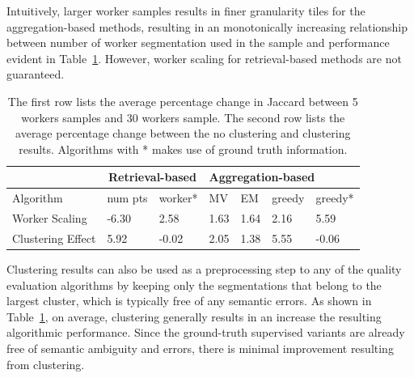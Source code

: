 \par \noindent Intuitively, larger worker samples results in finer granularity tiles for the aggregation-based methods, resulting in an monotonically increasing relationship between number of worker segmentation used in the sample and performance evident in Table~\ref{statsTable}. However, worker scaling for retrieval-based methods are not guaranteed.
\begin{table}[h!]
   \small
     \setlength\tabcolsep{1.5pt}
      \begin{tabular}{l|l|l|l|l|l|l}
         & \multicolumn{2}{c|}{Retrieval-based} & \multicolumn{4}{l}{Aggregation-based} \\ \hline
      Algorithm         & num pts         & worker*        & MV    & EM    & greedy  & greedy*  \\ \hline
      Worker Scaling    & -6.30           & 2.58               & 1.63  & 1.64  & 2.16    & 5.59         \\ \hline
      Clustering Effect & 5.92            & -0.02              & 2.05  & 1.38  & 5.55    & -0.06       
      \end{tabular}
      \caption{The first row lists the average percentage change in Jaccard between 5 workers samples and 30 workers sample. The second row lists the average percentage change between the no clustering and clustering results. Algorithms with * makes use of ground truth information.}
      \label{statsTable}
\end{table}
\vspace{-10pt}

\par \noindent Clustering results can also be used as a preprocessing step to any of the quality evaluation algorithms by keeping only the segmentations that belong to the largest cluster, which is typically free of any semantic errors. As shown in Table~\ref{statsTable}, on average, clustering generally results in an increase the resulting algorithmic performance. Since the ground-truth supervised variants are already free of semantic ambiguity and errors, there is minimal improvement resulting from clustering. %